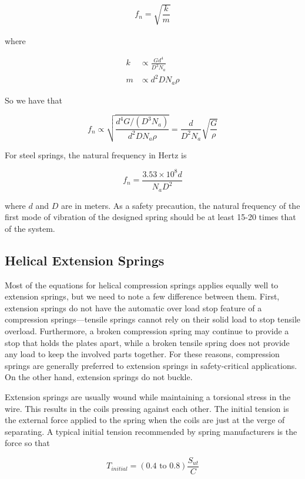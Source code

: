 \documentclass[
10pt,
a4paper,
openany,
svgnames,
]{book}
\begin{document}
\[\begin{gathered}
    f_n = \sqrt {\dfrac{k}{m}}
  \end{gathered} \]

where

\begin{align*}
    k &\propto \frac{Gd^4}{D^3N_a} \\
    m &\propto d^2DN_a\rho
\end{align*}

So we have that

\[f_n \propto \sqrt {\frac{d^4G/(D^3N_a)}{d^2DN_a\rho }}  = \frac{d}{D^2N_a}\sqrt {\frac{G}{\rho }} \]

For steel springs, the natural frequency in Hertz is

\begin{equation}
  f_n = \frac{3.53 \times 10^8d}{N_aD^2}
\end{equation}

where $d$ and $D$ are in meters.
As a safety precaution, the natural frequency of the first mode of vibration of the designed spring should be at least 15-20 times that of the system.

\subsection{Helical Extension Springs}

Most of the equations for helical compression springs applies equally well to extension springs, but we need to note a few difference between them. First, extension springs do not have the automatic over load stop feature of a compression springs—tensile springs cannot rely on their solid load to stop tensile overload. Furthermore, a broken compression spring may continue to provide a stop that holds the plates apart, while a broken tensile spring does not provide any load to keep the involved parts together. For these reasons, compression springs are generally preferred to extension springs in safety-critical applications. On the other hand, extension springs do not buckle.

Extension springs are usually wound while maintaining a torsional stress in the wire. This results in the coils pressing against each other. The initial tension is the external force applied to the spring when the coils are just at the verge of separating. A typical initial tension recommended by spring manufacturers is the force so that

\begin{equation}
  T_{initial} = (0.4 \text{ to } 0.8)\frac{S_{ut}}{C}
\end{equation}
\end{document}
